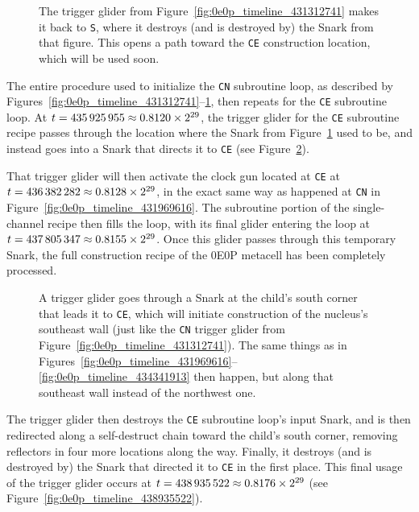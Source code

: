 \begin{figure}[!htb]
	\centering
	\caption{The trigger glider from Figure~\ref{fig:0e0p_timeline_431312741} makes it back to \texttt{S}, where it destroys (and is destroyed by) the Snark from that figure. This opens a path toward the \texttt{CE} construction location, which will be used soon.}
	\label{fig:0e0p_timeline_434724270}
\end{figure}

The entire procedure used to initialize the \texttt{CN} subroutine loop, as described by Figures~\ref{fig:0e0p_timeline_431312741}--\ref{fig:0e0p_timeline_434724270}, then repeats for the \texttt{CE} subroutine loop. At $t = 435{\,}925{\,}955 \approx 0.8120 \times 2^{29}$, the trigger glider for the \texttt{CE} subroutine recipe passes through the location where the Snark from Figure~\ref{fig:0e0p_timeline_434724270} used to be, and instead goes into a Snark that directs it to \texttt{CE} (see Figure~\ref{fig:0e0p_timeline_435925955}).

That trigger glider will then activate the clock gun located at \texttt{CE} at $t = 436{\,}382{\,}282 \approx 0.8128 \times 2^{29}$, in the exact same way as happened at \texttt{CN} in Figure~\ref{fig:0e0p_timeline_431969616}. The subroutine portion of the single-channel recipe then fills the loop, with its final glider entering the loop at $t = 437{\,}805{\,}347 \approx 0.8155 \times 2^{29}$. Once this glider passes through this temporary Snark, the full construction recipe of the 0E0P metacell has been completely processed.

\begin{figure}[!htb]
	\centering
	\caption{A trigger glider goes through a Snark at the child's south corner that leads it to \texttt{CE}, which will initiate construction of the nucleus's southeast wall (just like the \texttt{CN} trigger glider from Figure~\ref{fig:0e0p_timeline_431312741}). The same things as in Figures~\ref{fig:0e0p_timeline_431969616}--\ref{fig:0e0p_timeline_434341913} then happen, but along that southeast wall instead of the northwest one.}
	\label{fig:0e0p_timeline_435925955}
\end{figure}

The trigger glider then destroys the \texttt{CE} subroutine loop's input Snark, and is then redirected along a self-destruct chain toward the child's south corner, removing reflectors in four more locations along the way. Finally, it destroys (and is destroyed by) the Snark that directed it to \texttt{CE} in the first place. This final usage of the trigger glider occurs at $t = 438{\,}935{\,}522 \approx 0.8176 \times 2^{29}$ (see Figure~\ref{fig:0e0p_timeline_438935522}).

